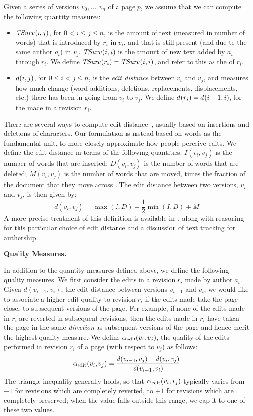 Given a series of versions $v_0,\ldots,v_n$ of a page $p$, we assume
that we can compute the following quantity measures:
%
\begin{itemize}

\item $\mathit{TSurv}_{}(i,j)$, for $0 < i \le j \le n$, is the amount of
	text (measured in number of words) that is introduced by
	$r_i$ in $v_i$, and that is still present (and due to the same
	author $a_i$) in $v_j$.
	$\mathit{TSurv}_{}(i,i)$ is the amount of new text added by $a_i$ through
	$r_i$.
	We define $\mathit{TSurv}_{}(r_i) = \mathit{TSurv}_{}(i,i)$, and refer to this
	as the  of $r_i$.

\item $d_{}(i,j)$, for $0 \le i < j \le n$, is the
	\textit{edit distance} between $v_i$ and $v_j$,
	and measures how much change
	(word additions, deletions, replacements, displacements, etc.)
	there has been in going from $v_i$ to $v_j$.
	We define $d_{}(r_i) = d_{}(i-1,i)$, for the 
	made in a revision $r_i$.
\end{itemize}
%
There are several ways to compute edit distance~\cite{Levenshtein66,TichyEditDist},
usually based on insertions and deletions of characters.
Our formulation is instead based on words as the fundamental unit,
to more closely approximate how people perceive edits.
We define the edit distance in terms of the following quantities:
$I(v_i, v_j)$ is the number of words that are inserted;
$D(v_i, v_j)$ is the number of words that are deleted;
$M(v_i, v_j)$ is the number of words that are moved, times the fraction
of the document that they move across \cite{Adler2007}.
The edit distance between two versions, $v_i$ and $v_j$, is
then given by:
%
\[
d(v_i, v_j) = \max(I, D) - \frac{1}{2}\min(I, D) + M
\]
%
A more precise treatment of this definition is available
in~\cite{Adler2007}, along with reasoning for this particular
choice of edit distance and a discussion of text tracking
for authorship.


\smallskip

\noindent\textbf{Quality Measures.}

In addition to the quantity measures defined above, we define the
following quality measures.
We first consider the edits in a revision $r_i$ made by author
$a_i$.
Given $d(v_{i-1}, v_i)$, the edit distance between versions
$v_{i-1}$ and $v_i$, we would like to associate a higher edit
quality to revision $r_i$ if the edits made take the page
closer to subsequent versions of the page.
For example, if none of the edits made in $r_i$ are reverted
in subsequent revisions, then the edits made in $r_i$
have taken the page in the same {\em direction\/} as subsequent 
versions of the page and hence merit the highest quality measure.
We define $\alpha_\text{edit}(v_i, v_j)$, the quality of the edits
performed in revision $r_i$ of a page (with respect to $v_j$) as follows:
%
\[
\alpha_\text{edit}(v_i, v_j) = 
\frac{d(v_{i-1}, v_j) - d(v_i, v_j)}{d(v_{i-1}, v_i)}
\]
%
The triangle inequality generally holds, so that
$\alpha_\text{edit}(v_i, v_j)$ typically varies from
$-1$ for revisions which are completely reverted,
to $+1$ for revisions which are completely preserved;
when the value falls outside this range, we
cap it to one of these two values.

